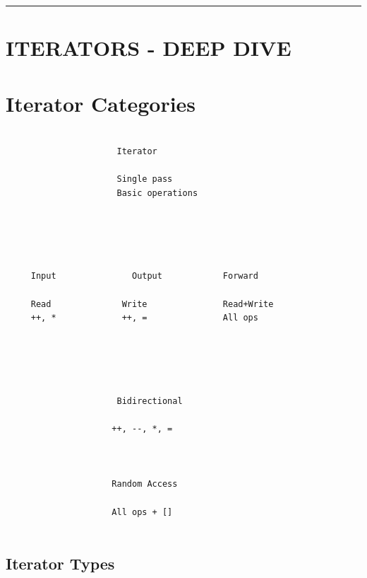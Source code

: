 \begin{center}\rule{0.5\linewidth}{0.5pt}\end{center}

\hypertarget{iterators---deep-dive}{%
\section{ITERATORS - DEEP DIVE}\label{iterators---deep-dive}}

\hypertarget{iterator-categories}{%
\section{Iterator Categories}\label{iterator-categories}}

\begin{lstlisting}
                    
                      Iterator           
                    
                      Single pass       
                      Basic operations  
                    
                               
        
                                                    
                      
     Input               Output            Forward  
                      
     Read              Write               Read+Write
     ++, *             ++, =               All ops  
                      
                                                     
                        
                        
                    
                      Bidirectional  
                    
                     ++, --, *, =    
                    
                             
                    
                     Random Access   
                    
                     All ops + []    
                    
\end{lstlisting}

\hypertarget{iterator-types}{%
\subsection{Iterator Types}\label{iterator-types}}

